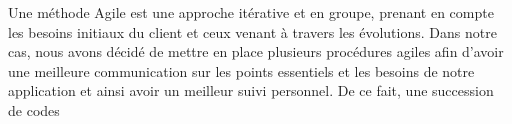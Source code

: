 Une méthode Agile est une approche itérative et en groupe, prenant en compte les besoins initiaux du client et ceux venant à travers les évolutions. Dans notre cas, nous avons décidé de mettre en place plusieurs procédures agiles afin d'avoir une meilleure communication sur les points essentiels et les besoins de notre application et ainsi avoir un meilleur suivi personnel. De ce fait, une succession de codes